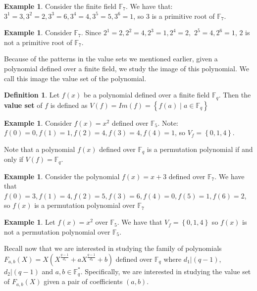 \documentclass{article}
\theoremstyle{definition}
\newtheorem{definition}[theorem]{Definition}
\newtheorem{example}[theorem]{Example}
\theoremstyle{remark}
\numberwithin{equation}{section}
\begin{document}
\begin{example}
  Consider the finite field $\mathbb{F}_{7}$. We have that: $3^1 = 3, 3^2 = 2, 3^3 = 6, 3^4 = 4, 3^5 = 5, 3^6 = 1$, so $3$ is a primitive root of $\mathbb{F}_{7}$.
\end{example}

\begin{example}
  Consider $\mathbb{F}_{7}$. Since $2^1 = 2, 2^2 = 4, 2^3 = 1, 2^4 = 2,$ $ 2^5 = 4, 2^6 = 1$, $2$ is not a primitive root of $\mathbb{F}_{7}$.
\end{example}

Because of the patterns in the value sets we mentioned earlier, given a polynomial defined over a finite field, we study the image of this polynomial. We call this image the value set of the polynomial.

\begin{definition}
  Let $f(x)$ be a polynomial defined over a finite field $\mathbb{F}_{q}$. Then the \textbf{value set} of $f$ is defined as $V(f) = Im(f) = \left\{f(a) \mid a \in \mathbb{F}_{q} \right\}$
\end{definition}

\begin{example}
  Consider $f(x) = x^2$ defined over $\mathbb{F}_{5}$. Note: $f(0) = 0, f(1) = 1, f(2) = 4, f(3) = 4, f(4) = 1$, so $V_{f} = \left\{0, 1, 4 \right\}$.
\end{example}

Note that a polynomial $f(x)$ defined over $\mathbb{F}_{q}$ is a permutation polynomial if and only if  $V(f) = \mathbb{F}_{q}$.


\begin{example}
  Consider the polynomial $f(x) = x+3$ defined over $\mathbb{F}_{7}$. We have that $f(0) = 3, f(1) = 4, f(2) = 5, f(3) = 6, f(4) = 0, f(5) = 1, f(6) = 2$, so $f(x)$ is a permutation polynomial over $\mathbb{F}_{7}$
\end{example}

\begin{example}
Let $f(x) = x^2$ over $\mathbb{F}_{5}$. We have that $V_{f} = \left\{0, 1, 4 \right\}$ so $f(x)$ is not a permutation polynomial over $\mathbb{F}_{5}$.
\end{example}

Recall now that we are interested in studying the family of polynomials $F_{a,b}(X) = X(X^{\frac{q-1}{d_1}} + aX^{\frac{q-1}{d_2}} +b)$ defined over $\mathbb{F}_q$ where $d_1 | (q-1)$, $d_2 | (q-1)$ and $a,b \in \mathbb{F}_q^*$. Specifically, we are interested in studying the value set of $F_{a,b}(X)$ given a pair of coefficients $(a,b)$.
\end{document}
